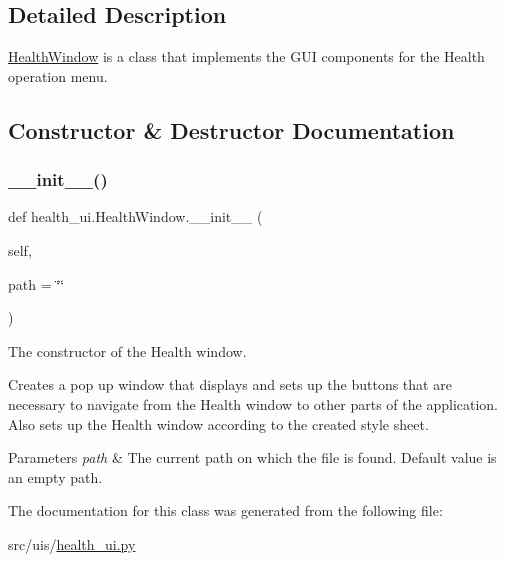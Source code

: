 \subsection{Detailed Description}
\hyperlink{classhealth__ui_1_1_health_window}{Health\+Window} is a class that implements the G\+UI components for the Health operation menu. 

\subsection{Constructor \& Destructor Documentation}
\mbox{\label{classhealth__ui_1_1_health_window_aca4eb93be30367445762dc27584bfde5}} 
\subsubsection{\texorpdfstring{\+\_\+\+\_\+init\+\_\+\+\_\+()}{\_\_init\_\_()}}
{\footnotesize\ttfamily def health\+\_\+ui.\+Health\+Window.\+\_\+\+\_\+init\+\_\+\+\_\+ (\begin{DoxyParamCaption}\item[{}]{self,  }\item[{}]{path = {\ttfamily \char`\"{}\char`\"{}} }\end{DoxyParamCaption})}



The constructor of the Health window. 

Creates a pop up window that displays and sets up the buttons that are necessary to navigate from the Health window to other parts of the application. Also sets up the Health window according to the created style sheet. 
\begin{DoxyParams}{Parameters}
{\em path} & The current path on which the file is found. Default value is an empty path. \\
\hline
\end{DoxyParams}


The documentation for this class was generated from the following file\+:\begin{DoxyCompactItemize}
\item 
src/uis/\hyperlink{health__ui_8py}{health\+\_\+ui.\+py}\end{DoxyCompactItemize}
